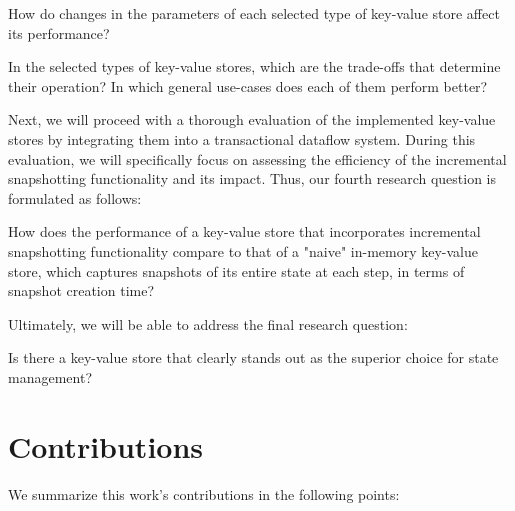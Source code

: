 \begin{tcolorbox}
    How do changes in the parameters of each selected type of key-value store affect its performance?
\end{tcolorbox}
\vspace{8px}

\begin{tcolorbox}
    In the selected types of key-value stores, which are the trade-offs that determine their operation? In which general use-cases does each of them perform better?
\end{tcolorbox}
\vspace{8px}

Next, we will proceed with a thorough evaluation of the implemented key-value stores by integrating them into a transactional dataflow system. During this evaluation, we will specifically focus on assessing the efficiency of the incremental snapshotting functionality and its impact. Thus, our fourth research question is formulated as follows:\\

\begin{tcolorbox}
    How does the performance of a key-value store that incorporates incremental snapshotting functionality compare to that of a "naive" in-memory key-value store, which captures snapshots of its entire state at each step, in terms of snapshot creation time?
\end{tcolorbox}
\vspace{8px}

Ultimately, we will be able to address the final research question:\\

\begin{tcolorbox}
    Is there a key-value store that clearly stands out as the superior choice for state management?
\end{tcolorbox}
\vspace{8px}

\section{Contributions}

We summarize this work's contributions in the following points:

